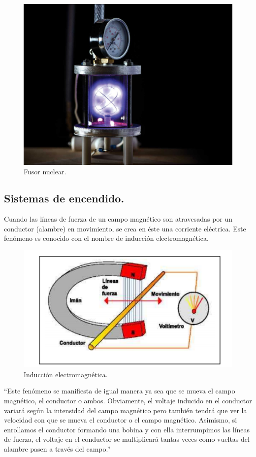 \begin{figure}[H]
\centering
\includegraphics[width=12cm]{capitulo3/figs/fusor.png}
\caption{ Fusor nuclear.}
\end{figure}

\subsection{Sistemas de encendido.}

Cuando las líneas de fuerza de un campo magnético son
atravesadas por un conductor (alambre) en movimiento, se crea en éste
una corriente eléctrica. Este fenómeno es conocido con el nombre de
inducción electromagnética.\\

\begin{figure}[H]
\centering
\includegraphics[width=12cm]{capitulo3/figs/induc.png}
\caption{ Inducción electromagnética.}
\end{figure}

``Este fenómeno se manifiesta de igual manera ya sea que se
mueva el campo magnético, el conductor o ambos. Obviamente, el voltaje
inducido en el conductor variará según la intensidad del campo magnético
pero también tendrá que ver la velocidad con que se mueva el conductor o el campo magnético. Asimismo, si enrollamos el conductor formando una
bobina y con ella interrumpimos las líneas de fuerza, el voltaje en el
conductor se multiplicará tantas veces como vueltas del alambre pasen a
través del campo.''\\

